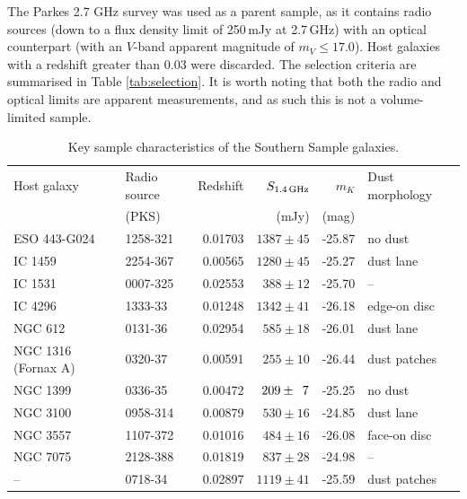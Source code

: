 	The Parkes 2.7 GHz survey \citep{Ekers1989} was used as a parent sample, as it contains radio sources (down to a flux density limit of 250\,mJy at 2.7\,GHz) with an optical counterpart (with an $V$-band apparent magnitude of $m_V \le 17.0$). Host galaxies with a redshift greater than 0.03 were discarded. The selection criteria are summarised in Table \ref{tab:selection}. It is worth noting that both the radio and optical limits are apparent measurements, and as such this is not a volume-limited sample.

	\begin{table}
		\centering
	\begin{threeparttable}
		\caption{Key sample characteristics of the Southern Sample galaxies.}
		\label{tab:sample}
		\begin{tabular}{l l r r r l}
			\hline
			\hline
			Host galaxy	& Radio source 	& Redshift	& $S_\text{1.4\,GHz}$	& $m_K$ & Dust morphology\\
						& (PKS) 		& 			& (mJy) 			& (mag)	&\\
			\hline 
			ESO 443-G024 & 1258-321 	& 0.01703	& $1387 \pm 45$		& -25.87 & no dust\tnote{a}	\\ 
			IC 1459 	& 2254-367 		& 0.00565 	& $1280 \pm 45$		& -25.27 & dust lane\tnote{b}	\\
			IC 1531 	& 0007-325 		& 0.02553 	& $388 \pm 12$		& -25.70 & --					\\
			IC 4296		& 1333-\leavevmode\phantom{0}33 		& 0.01248 	& $1342 \pm 41$		& -26.18 & edge-on disc\tnote{b} \\
			NGC 612 	& 0131-\leavevmode\phantom{0}36 		& 0.02954 	& $585 \pm 18$		& -26.01 & dust lane\tnote{c}	\\
			NGC 1316 (Fornax A) & 0320-\leavevmode\phantom{0}37 & 0.00591 	& $255 \pm 10$		& -26.44 & dust patches\tnote{b} \\
			NGC 1399 	& 0336-\leavevmode\phantom{0}35 & 0.00472 	& $209 \pm \leavevmode\phantom{0}7$	& -25.25 & no dust\tnote{b}	\\
			NGC 3100 	& 0958-314 		& 0.00879 	& $530 \pm 16$		& -24.85 & dust lane\tnote{d}	\\
			NGC 3557 	& 1107-372 		& 0.01016 	& $484 \pm 16$		& -26.08 & face-on disc\tnote{b}\\
			NGC 7075 	& 2128-388 		& 0.01819 	& $837 \pm 28$		& -24.98 & --					\\
			--			& 0718-\leavevmode\phantom{0}34 		& 0.02897 	& $1119 \pm 41$		& -25.59 & dust patches\tnote{e} \\
			\hline

\end{tabular}
\end{threeparttable}
\end{table}
